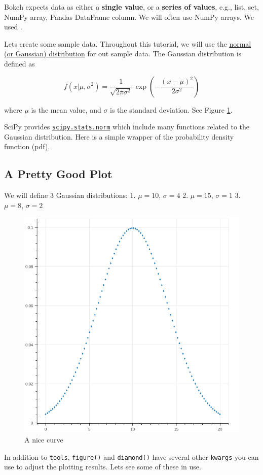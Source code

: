 \documentclass[11pt]{article}
\makeatletter
\def\maxwidth{\ifdim\Gin@nat@width>\linewidth\linewidth
    \else\Gin@nat@width\fi}
\let\Oldincludegraphics\includegraphics
\renewcommand{\includegraphics}[1]{\Oldincludegraphics[width=.8\maxwidth]{#1}}
\makeatother
\begin{document}
    Bokeh expects data as either a \textbf{single value}, or a
\textbf{series of values}, e.g., list, set, NumPy array, Pandas
DataFrame column. We will often use NumPy arrays. We used
\cite{DUMMY:1}.

Lets create some sample data. Throughout this tutorial, we will use the
\href{https://en.wikipedia.org/wiki/Normal_distribution}{normal (or
Gaussian) distribution} for out sample data. The Gaussian distribution
is defined as

    \[f(x | \mu, \sigma^2) = \frac{1}{\sqrt{2\pi\sigma^2}} \,\exp\left({-\frac{(x-\mu)^2}{2\sigma^2}}\right)\]

    where \(\mu\) is the mean value, and \(\sigma\) is the standard
deviation. See Figure \ref{fig:nice}.

SciPy provides
\href{https://docs.scipy.org/doc/scipy/reference/generated/scipy.stats.norm.html}{\texttt{scipy.stats.norm}}
which include many functions related to the Gaussian distribution. Here
is a simple wrapper of the probability density function (pdf).

    \subsection{A Pretty Good Plot}\label{a-pretty-good-plot}

    We will define 3 Gaussian distributions: 1. \(\mu=10\), \(\sigma=4\) 2.
\(\mu=15\), \(\sigma=1\) 3. \(\mu=8\), \(\sigma=2\)

    
        
    \begin{figure}[h!]
      \centering
      \includegraphics{img/nice.png}
      \caption{A nice curve}
      \label{fig:nice}
	\end{figure}
    In addition to \texttt{tools}, \texttt{figure()} and \texttt{diamond()}
have several other \texttt{kwargs} you can use to adjust the plotting
results. Lets see some of these in use.
\end{document}
